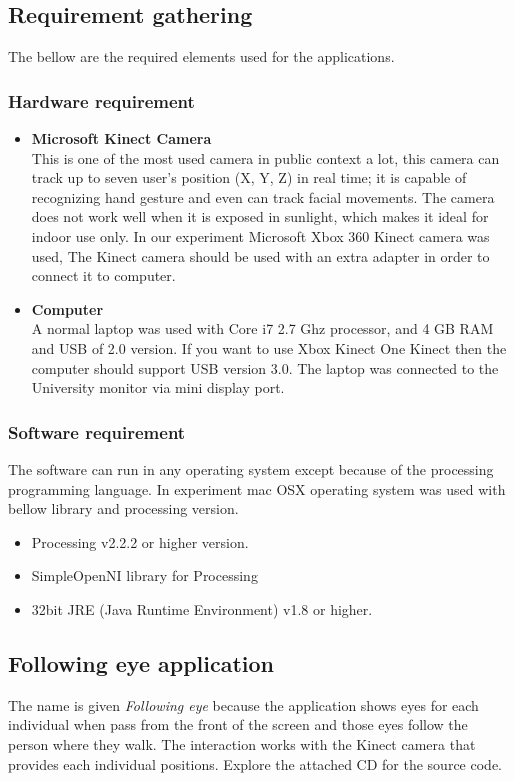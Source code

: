 \subsection{Requirement gathering}
The bellow are the required elements used for the applications.


\subsubsection{Hardware requirement}

\begin{itemize}
\item \textbf{Microsoft Kinect Camera} \cite{Kinect} \\
This is one of the most used camera in public context a lot, this camera can track up to seven user's position (X, Y, Z) in real time; it is capable of recognizing hand gesture and even can track facial movements. The camera does not work well when it is exposed in sunlight, which makes it ideal for indoor use only. In our experiment Microsoft Xbox 360 Kinect camera was used, The Kinect camera should be used with an extra adapter in order to connect it to computer. 
\item \textbf{Computer} \\
A normal laptop was used with Core i7 2.7 Ghz processor, and 4 GB RAM and USB of 2.0 version.
If you want to use Xbox Kinect One Kinect then the computer should support USB version 3.0.
The laptop was connected to the University monitor via mini display port.

\end{itemize}


\subsubsection{Software requirement}
The software can run in any operating system except because of the processing programming language. In experiment mac OSX operating system was used with bellow library and processing version.
\begin{itemize}
\item Processing v2.2.2 or higher version.
\item SimpleOpenNI library for Processing \cite{simpleopenni}
\item 32bit JRE (Java Runtime Environment) v1.8 or higher.
\end{itemize}


\subsection{Following eye application}
The name is given \emph{Following eye} because the application shows eyes for each individual when pass from the front of the screen and those eyes follow the person where they walk. The interaction works with the Kinect camera that provides each individual positions.
Explore the attached CD for the source code.

